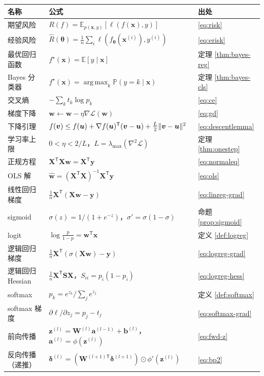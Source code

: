 \documentclass[UTF8,a4paper,11pt]{ctexart}
\theoremstyle{definition}
\theoremstyle{plain}
\theoremstyle{remark}
\DeclarePairedDelimiter{\norm}{\lVert}{\rVert}
\DeclareMathOperator*{\argmax}{arg\,max}
\newcommand{\E}{\mathbb{E}}
\newcommand{\Prob}{\mathbb{P}}
\newcommand{\Loss}{\mathcal{L}}
\newcommand{\T}{^{\mathsf{T}}}
\begin{document}
\begin{center}
\begin{tabular}{@{}p{}p{}p{}@{}}
\toprule
名称 & 公式 & 出处\\
\midrule
期望风险 & $R(f)=\E_{p(\bm{x},y)}[\ell(f(\bm{x}),y)]$ & \eqref{eq:risk}\\
经验风险 & $\hat R(\bm{\theta})=\frac1n\sum_i\ell(f_{\bm{\theta}}(\bm{x}^{(i)}),y^{(i)})$ & \eqref{eq:erisk}\\
最优回归函数 & $f^\star(\bm{x})=\E[y\mid\bm{x}]$ & 定理 \ref{thm:bayes-reg}\\
Bayes 分类器 & $f^\star(\bm{x})=\argmax_k\Prob(y=k\mid\bm{x})$ & 定理 \ref{thm:bayes-cls}\\
交叉熵 & $-\sum_k t_k\log p_k$ & \eqref{eq:ce}\\
梯度下降 & $\bm{w}\leftarrow\bm{w}-\eta\nabla\Loss(\bm{w})$ & \eqref{eq:gd}\\
下降引理 & $f(\bm{v})\le f(\bm{u})+\nabla f(\bm{u})\T(\bm{v}-\bm{u})+\frac{L}{2}\norm{\bm{v}-\bm{u}}^2$ & \eqref{eq:descentlemma}\\
学习率上限 & $0<\eta<2/L$，$L=\lambda_{\max}(\nabla^2\Loss)$ & 定理 \ref{thm:onestep}\\
正规方程 & $\bm{X}\T\bm{X}\bm{w}=\bm{X}\T\bm{y}$ & \eqref{eq:normaleq}\\
OLS 解 & $\hat{\bm{w}}=(\bm{X}\T\bm{X})^{-1}\bm{X}\T\bm{y}$ & \eqref{eq:ols}\\
线性回归梯度 & $\frac1n\bm{X}\T(\bm{X}\bm{w}-\bm{y})$ & \eqref{eq:linreg-grad}\\
sigmoid & $\sigma(z)=1/(1+e^{-z})$，$\sigma'=\sigma(1-\sigma)$ & 命题 \ref{prop:sigmoid}\\
logit & $\log\frac{p}{1-p}=\bm{w}\T\bm{x}$ & 定义 \ref{def:logreg}\\
逻辑回归梯度 & $\frac1n\bm{X}\T(\sigma(\bm{X}\bm{w})-\bm{y})$ & \eqref{eq:logreg-grad}\\
逻辑回归 Hessian & $\frac1n\bm{X}\T\bm{S}\bm{X}$，$S_{ii}=p_i(1-p_i)$ & \eqref{eq:logreg-hess}\\
softmax & $p_k=e^{z_k}/\sum_je^{z_j}$ & 定义 \ref{def:softmax}\\
softmax 梯度 & $\partial\ell/\partial z_j=p_j-t_j$ & \eqref{eq:softmax-grad}\\
前向传播 & $\bm{z}^{(l)}=\bm{W}^{(l)}\bm{a}^{(l-1)}+\bm{b}^{(l)}$，$\bm{a}^{(l)}=\phi(\bm{z}^{(l)})$ & \eqref{eq:fwd-z}\\
反向传播（递推） & $\bm{\delta}^{(l)}=(\bm{W}^{(l+1)\mathsf{T}}\bm{\delta}^{(l+1)})\odot\phi'(\bm{z}^{(l)})$ & \eqref{eq:bp2}\\

\end{tabular}
\end{center}
\end{document}
